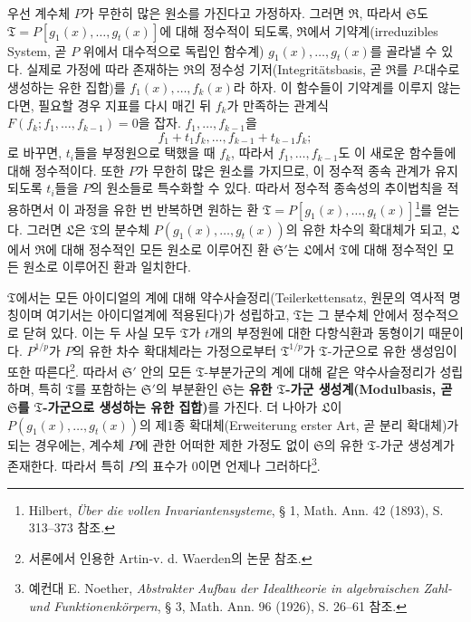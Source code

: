우선 계수체 $P$가 무한히 많은 원소를 가진다고 가정하자. 그러면 $\mathfrak R$, 따라서 $\mathfrak S$도 $\mathfrak T=P[g_1(x),\ldots,g_t(x)]$에 대해 정수적이 되도록, $\mathfrak R$에서 기약계(irreduzibles System, 곧 $P$ 위에서 대수적으로 독립인 함수계) $g_1(x),\ldots,g_t(x)$를 골라낼 수 있다. 실제로 가정에 따라 존재하는 $\mathfrak R$의 정수성 기저(Integritätsbasis, 곧 $\mathfrak R$를 $P$-대수로 생성하는 유한 집합)를 $f_1(x),\ldots,f_k(x)$라 하자. 이 함수들이 기약계를 이루지 않는다면, 필요할 경우 지표를 다시 매긴 뒤 $f_k$가 만족하는 관계식 $F(f_k;f_1,\ldots,f_{k-1})=0$을 잡자. $f_1,\ldots,f_{k-1}$을
\[
 f_1+t_1f_k,\ldots,f_{k-1}+t_{k-1}f_k;
\]
로 바꾸면, $t_i$들을 부정원으로 택했을 때 $f_k$, 따라서 $f_1,\ldots,f_{k-1}$도 이 새로운 함수들에 대해 정수적이다. 또한 $P$가 무한히 많은 원소를 가지므로, 이 정수적 종속 관계가 유지되도록 $t_i$들을 $P$의 원소들로 특수화할 수 있다. 따라서 정수적 종속성의 추이법칙을 적용하면서 이 과정을 유한 번 반복하면 원하는 환 $\mathfrak T=P[g_1(x),\ldots,g_t(x)]$\footnote{Hilbert, \emph{Über die vollen Invariantensysteme}, § 1, Math. Ann. 42 (1893), S. 313--373 참조.}를 얻는다. 그러면 $\mathfrak L$은 $\mathfrak T$의 분수체 $P(g_1(x),\ldots,g_t(x))$의 유한 차수의 확대체가 되고, $\mathfrak L$에서 $\mathfrak R$에 대해 정수적인 모든 원소로 이루어진 환 $\mathfrak S'$는 $\mathfrak L$에서 $\mathfrak T$에 대해 정수적인 모든 원소로 이루어진 환과 일치한다.

$\mathfrak T$에서는 모든 아이디얼의 계에 대해 약수사슬정리(Teilerkettensatz, 원문의 역사적 명칭이며 여기서는 아이디얼계에 적용된다)가 성립하고, $\mathfrak T$는 그 분수체 안에서 정수적으로 닫혀 있다. 이는 두 사실 모두 $\mathfrak T$가 $t$개의 부정원에 대한 다항식환과 동형이기 때문이다. $P^{1/p}$가 $P$의 유한 차수 확대체라는 가정으로부터 $\mathfrak T^{1/p}$가 $\mathfrak T$-가군으로 유한 생성임이 또한 따른다\footnote{서론에서 인용한 Artin-v. d. Waerden의 논문 참조.}. 따라서 $\mathfrak S'$ 안의 모든 $\mathfrak T$-부분가군의 계에 대해 같은 약수사슬정리가 성립하며, 특히 $\mathfrak T$를 포함하는 $\mathfrak S'$의 부분환인 $\mathfrak S$는 \textbf{유한 $\mathfrak T$-가군 생성계(Modulbasis, 곧 $\mathfrak S$를 $\mathfrak T$-가군으로 생성하는 유한 집합)}\footnotemark[\value{footnote}]를 가진다. 더 나아가 $\mathfrak L$이 $P(g_1(x),\ldots,g_t(x))$의 제1종 확대체(Erweiterung erster Art, 곧 분리 확대체)가 되는 경우에는, 계수체 $P$에 관한 어떠한 제한 가정도 없이 $\mathfrak S$의 유한 $\mathfrak T$-가군 생성계가 존재한다. 따라서 특히 $P$의 표수가 0이면 언제나 그러하다\footnote{예컨대 E. Noether, \emph{Abstrakter Aufbau der Idealtheorie in algebraischen Zahl- und Funktionenk\"orpern}, § 3, Math. Ann. 96 (1926), S. 26--61 참조.}.

